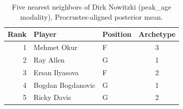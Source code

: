 \begin{table}[htbp]
  \centering\small
  \begin{tabular}{rllc}
    \toprule
    Rank & Player & Position & Archetype \\
    \midrule
    1 & Mehmet Okur & F & 3 \\
    2 & Ray Allen & G & 1 \\
    3 & Ersan Ilyasova & F & 2 \\
    4 & Bogdan Bogdanovic & G & 1 \\
    5 & Ricky Davis & G & 2 \\
    \bottomrule
  \end{tabular}
  \caption{Five nearest neighbors of Dirk Nowitzki (peak_age modality), Procrustes-aligned posterior mean.}
  \label{tab:Dirk_Nowitzki_neighbors_peak_age}
\end{table}

